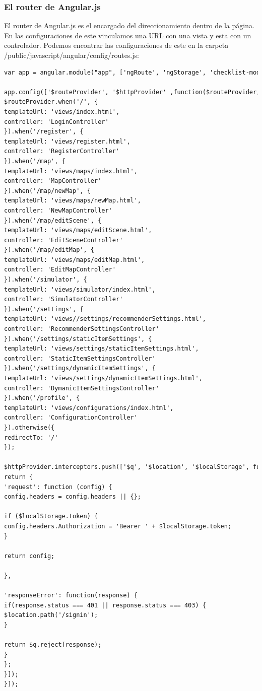 \subsubsection{El router de Angular.js}

El router de Angular.js es el encargado del direccionamiento dentro de la página. En las configuraciones de este vinculamos una URL con una vista y esta con un controlador. Podemos encontrar las configuraciones de este en la carpeta /public/javascript/angular/config/routes.js:

\begin{lstlisting}[language=xml, frame=single]
var app = angular.module("app", ['ngRoute', 'ngStorage', 'checklist-model', 'xeditable']);

app.config(['$routeProvider', '$httpProvider' ,function($routeProvider, $httpProvider) {	 		   
$routeProvider.when('/', {
templateUrl: 'views/index.html',
controller: 'LoginController'
}).when('/register', {
templateUrl: 'views/register.html',
controller: 'RegisterController'
}).when('/map', {
templateUrl: 'views/maps/index.html',
controller: 'MapController'
}).when('/map/newMap', {
templateUrl: 'views/maps/newMap.html',
controller: 'NewMapController'        
}).when('/map/editScene', {
templateUrl: 'views/maps/editScene.html',
controller: 'EditSceneController'        
}).when('/map/editMap', {
templateUrl: 'views/maps/editMap.html',
controller: 'EditMapController'
}).when('/simulator', {
templateUrl: 'views/simulator/index.html',
controller: 'SimulatorController'
}).when('/settings', {
templateUrl: 'views//settings/recommenderSettings.html',
controller: 'RecommenderSettingsController'
}).when('/settings/staticItemSettings', {
templateUrl: 'views/settings/staticItemSettings.html',
controller: 'StaticItemSettingsController'
}).when('/settings/dynamicItemSettings', {
templateUrl: 'views/settings/dynamicItemSettings.html',
controller: 'DymanicItemSettingsController'
}).when('/profile', {
templateUrl: 'views/configurations/index.html',
controller: 'ConfigurationController'
}).otherwise({
redirectTo: '/'
}); 

$httpProvider.interceptors.push(['$q', '$location', '$localStorage', function($q, $location, $localStorage) {
return {  
'request': function (config) {    
config.headers = config.headers || {};

if ($localStorage.token) {
config.headers.Authorization = 'Bearer ' + $localStorage.token;
}

return config;

},

'responseError': function(response) {
if(response.status === 401 || response.status === 403) {
$location.path('/signin');
}

return $q.reject(response);
}
};    
}]);    
}]);
\end{lstlisting}

